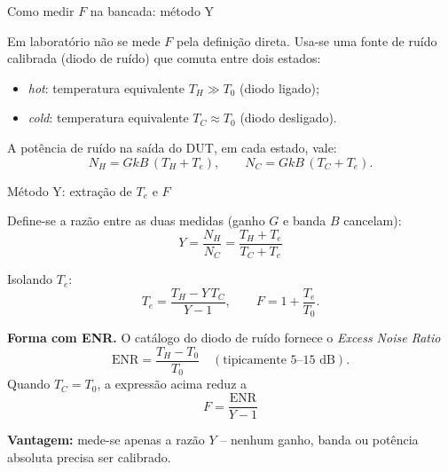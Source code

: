 
\begin{frame}{Como medir $F$ na bancada: método Y}

Em laboratório não se mede $F$ pela definição direta. Usa-se uma fonte de ruído calibrada (diodo de ruído) que comuta entre dois estados:
\begin{itemize}
\item \emph{hot}: temperatura equivalente $T_H \gg T_0$ (diodo ligado);
\item \emph{cold}: temperatura equivalente $T_C \approx T_0$ (diodo desligado).
\end{itemize}

\begin{center}
\end{center}

A potência de ruído na saída do DUT, em cada estado, vale:
\[
N_H = G k B \,(T_H + T_e), \qquad N_C = G k B \,(T_C + T_e).
\]

\end{frame}


\begin{frame}{Método Y: extração de $T_e$ e $F$}

Define-se a razão entre as duas medidas (ganho $G$ e banda $B$ cancelam):
\[
Y = \frac{N_H}{N_C} = \frac{T_H + T_e}{T_C + T_e}
\]

Isolando $T_e$:
\[
T_e = \frac{T_H - Y\, T_C}{Y - 1}, \qquad F = 1 + \frac{T_e}{T_0}.
\]

\textbf{Forma com ENR.} O catálogo do diodo de ruído fornece o \emph{Excess Noise Ratio}
\[
\text{ENR} = \frac{T_H - T_0}{T_0} \quad (\text{tipicamente } 5\text{--}15 \text{ dB}).
\]
Quando $T_C = T_0$, a expressão acima reduz a
\[
\boxed{\, F = \frac{\text{ENR}}{Y - 1} \,}
\]

\textbf{Vantagem:} mede-se apenas a razão $Y$ -- nenhum ganho, banda ou potência absoluta precisa ser calibrado.

\end{frame}

